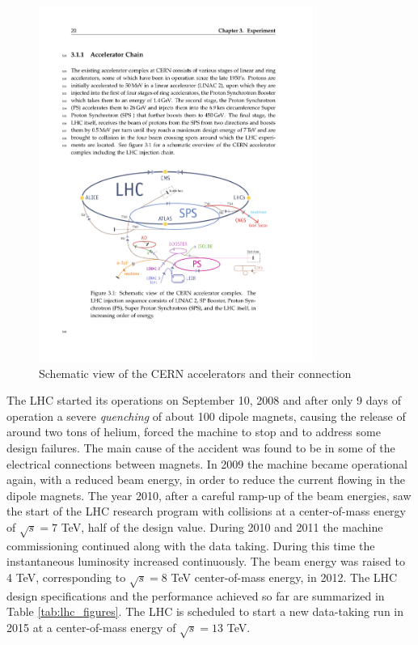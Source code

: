 \begin{figure}
\begin{center}
\includegraphics[angle=-0,width=0.8\textwidth]{2_LHC_and_CMS/pics/LHC.pdf}
\caption{Schematic view of the CERN accelerators and their connection
\label{fig:cern_accelerators}
}
\end{center}
\end{figure}

The LHC started its operations on September 10, 2008 and after only 9 days of operation a severe \emph{quenching} of about 100 dipole magnets, causing the release of around two tons of helium, forced the machine to stop and to address some design failures. The main cause of the accident was found to be in some of the electrical connections between magnets. In 2009 the machine became operational again, with a reduced beam energy, in order to reduce the current flowing in the dipole magnets. The year 2010, after a careful ramp-up of the beam energies, saw the start of the LHC research program with collisions at a center-of-mass energy of $\sqrt{s} = 7$ TeV, half of the design value. During 2010 and 2011 the machine commissioning continued along with the data taking. During this time the instantaneous luminosity increased continuously. The beam energy was raised to 4 TeV, corresponding to $\sqrt{s} = 8$ TeV center-of-mass energy, in 2012. The LHC design specifications and the performance achieved so far are summarized in Table \ref{tab:lhc_figures}. The LHC is scheduled to start a new data-taking run in 2015 at a center-of-mass energy of $\sqrt{s} = 13$ TeV.

